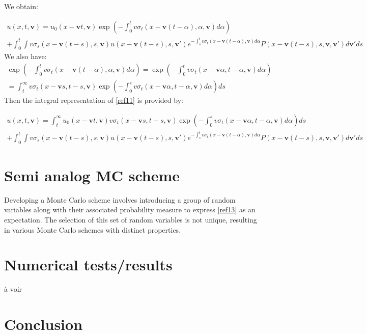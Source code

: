 \documentclass[a4paper, 11pt]{article}
\begin{document}
We obtain:

\begin{multline}
	u(x,t,\textbf{v}) = u_0(x - \textbf{v}t, \textbf{v}) \exp\left(- \int_{0}^{t} v\sigma_t\left(x - \textbf{v}(t - \alpha), \alpha, \textbf{v}\right) d\alpha\right) \\
	+ \int_{0}^{t} \int v\sigma_s\left(x - \textbf{v}(t - s), s, \textbf{v}\right) u\left(x - \textbf{v}(t - s), s, \textbf{v}'\right) e^{- \int_s^t v\sigma_t\left(x - \textbf{v}(t - \alpha), \textbf{v}\right) d\alpha} P\left(x - \textbf{v}(t - s), s, \textbf{v}, \textbf{v}'\right) d\textbf{v}'ds \label{ref1}
\end{multline}
We also have:
\begin{multline}
	\exp\left(- \int_{0}^{t} v\sigma_t\left(x - \textbf{v}(t - \alpha), \alpha, \textbf{v}\right) d\alpha\right) = \exp\left(- \int_{0}^{t} v\sigma_t\left(x - \textbf{v} \alpha,t- \alpha, \textbf{v}\right) d\alpha\right) \\ = \int _t^\infty  v\sigma_t\left(x - \textbf{v} s,t- s, \textbf{v}\right)
	\exp\left(- \int_{0}^{s} v\sigma_t\left(x - \textbf{v} \alpha,t- \alpha, \textbf{v}\right) d\alpha\right) ds
\end{multline}
Then the integral representation of \ref{ref11} is provided by:

\begin{multline}
	u(x,t,\textbf{v}) =  \int _t^\infty  u_0(x - \textbf{v}t, \textbf{v}) v\sigma_t\left(x - \textbf{v} s,t- s, \textbf{v}\right)
	\exp\left(- \int_{0}^{s} v\sigma_t\left(x - \textbf{v} \alpha,t- \alpha, \textbf{v}\right) d\alpha\right) ds\\
	+ \int_{0}^{t} \int v\sigma_s\left(x - \textbf{v}(t - s), s, \textbf{v}\right) u\left(x - \textbf{v}(t - s), s, \textbf{v}'\right) e^{- \int_s^t v\sigma_t\left(x - \textbf{v}(t - \alpha), \textbf{v}\right) d\alpha} P\left(x - \textbf{v}(t - s), s, \textbf{v}, \textbf{v}'\right) d\textbf{v}'ds \label{ref13}
\end{multline}


\section{Semi analog MC scheme}

Developing a Monte Carlo scheme involves introducing a group of random variables along with their associated probability measure to express \ref{ref13} as an expectation. The selection of this set of random variables is not unique, resulting in various Monte Carlo schemes with distinct properties.

\section{Numerical tests/results}

à voir

\section{Conclusion}


	
	
\end{document}
